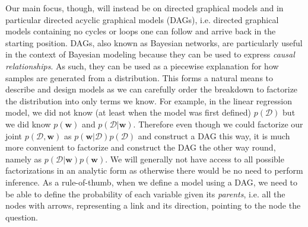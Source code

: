 Our main focus, though, will instead be on directed graphical models and in particular directed acyclic 
graphical models (DAGs), i.e. directed graphical models containing no cycles or loops one can follow 
and arrive back in the starting position.  DAGs, also known as Bayesian networks, are particularly
useful in the context of Bayesian modeling because they can be used to express \emph{causal relationships}.
As such, they can be used as a piecewise explanation for how samples are generated from a distribution.
This forms a natural means to describe and design models as
we can carefully order the breakdown to factorize the distribution into only terms we know.  For example,
in the linear regression model, we did not know (at least when the model was first defined) 
$p(\mathcal{D})$ but we did know $p(\mathbf{w})$ and $p(\mathcal{D} | \mathbf{w})$.  Therefore even
though we could factorize our joint $p(\mathcal{D}, \mathbf{w})$ as 
$p(\mathbf{w} | \mathcal{D})p(\mathcal{D})$ and construct a DAG this way, it is much more convenient
to factorize and construct the DAG the other way round, namely as 
$p(\mathcal{D} | \mathbf{w})p(\mathbf{w})$.
We will generally not have access to all possible factorizations
in an analytic form as otherwise there would be no need to perform inference.
As a rule-of-thumb, when we define a model using a DAG, we need to be able to define the 
probability of each variable given its \emph{parents}, i.e. all the nodes with arrows, representing a link and its direction, pointing
to the node the question.

